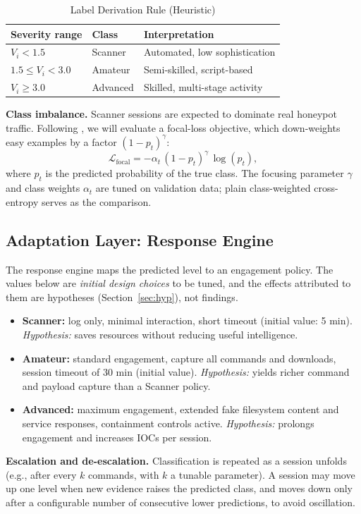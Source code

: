 \documentclass[conference]{IEEEtran}
\begin{document}
\begin{table}[t]
\centering
\caption{Label Derivation Rule (Heuristic)}
\label{tab:label}
\footnotesize
\begin{tabular}{@{}lll@{}}
\toprule
Severity range & Class & Interpretation \\
\midrule
$V_i<1.5$ & Scanner & Automated, low sophistication \\
$1.5\le V_i<3.0$ & Amateur & Semi-skilled, script-based \\
$V_i\ge 3.0$ & Advanced & Skilled, multi-stage activity \\
\bottomrule
\end{tabular}
\end{table}

\textbf{Class imbalance.} Scanner sessions are expected to dominate real honeypot traffic. Following \cite{ref2}, we will evaluate a focal-loss objective, which down-weights easy examples by a factor $(1-p_t)^\gamma$:
\begin{equation}
\mathcal{L}_{\text{focal}} = -\alpha_t\,(1-p_t)^{\gamma}\,\log(p_t),
\end{equation}
where $p_t$ is the predicted probability of the true class. The focusing parameter $\gamma$ and class weights $\alpha_t$ are tuned on validation data; plain class-weighted cross-entropy serves as the comparison.

\subsection{Adaptation Layer: Response Engine}\label{sec:resp}
The response engine maps the predicted level to an engagement policy. The values below are \emph{initial design choices} to be tuned, and the effects attributed to them are hypotheses (Section~\ref{sec:hyp}), not findings.
\begin{itemize}
\item \textbf{Scanner:} log only, minimal interaction, short timeout (initial value: 5 min). \emph{Hypothesis:} saves resources without reducing useful intelligence.
\item \textbf{Amateur:} standard engagement, capture all commands and downloads, session timeout of 30 min (initial value). \emph{Hypothesis:} yields richer command and payload capture than a Scanner policy.
\item \textbf{Advanced:} maximum engagement, extended fake filesystem content and service responses, containment controls active. \emph{Hypothesis:} prolongs engagement and increases IOCs per session.
\end{itemize}
\textbf{Escalation and de-escalation.} Classification is repeated as a session unfolds (e.g., after every $k$ commands, with $k$ a tunable parameter). A session may move up one level when new evidence raises the predicted class, and moves down only after a configurable number of consecutive lower predictions, to avoid oscillation.
\end{document}
